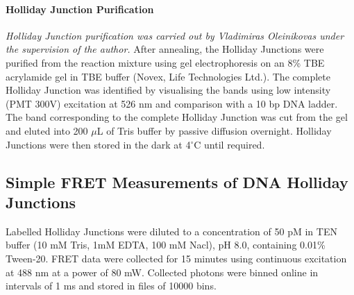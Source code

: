 \paragraph{Holliday Junction Purification}
\emph{Holliday Junction purification was carried out by \mbox{Vladimiras} Oleinikovas under the supervision of the author.}
After annealing, the Holliday Junctions were purified from the reaction mixture using gel electrophoresis on an 8\% TBE acrylamide gel in TBE buffer (Novex, Life Technologies Ltd.). The complete Holliday Junction was identified by visualising the bands using low intensity (PMT 300V) excitation at 526 nm and comparison with a 10 bp DNA ladder. The band corresponding to the complete Holliday Junction was cut from the gel and eluted into 200 $\mu$L of Tris buffer by passive diffusion overnight. Holliday Junctions were then stored in the dark at 4$^{\circ}$C until required.

\subsection{Simple FRET Measurements of DNA Holliday Junctions}
Labelled Holliday Junctions were diluted to a concentration of 50 pM in TEN buffer (10 mM Tris, 1mM EDTA, 100 mM Nacl), pH 8.0, containing 0.01\% Tween-20. FRET data were collected for 15 minutes using continuous excitation at 488 nm at a power of 80 mW. Collected photons were binned online in intervals of 1 ms and stored in files of 10000 bins. 


